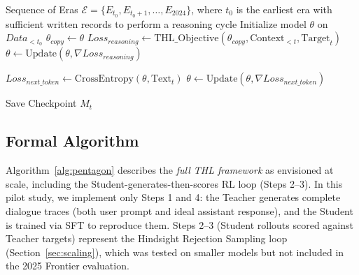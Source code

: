 \documentclass[11pt,a4paper]{article}
\begin{document}
\begin{algorithm}[ht]
\caption{The Council of Time (Iterative Era Learning)}
\label{alg:council}
\begin{algorithmic}[1]
\REQUIRE Sequence of Eras $\mathcal{E} = \{E_{t_0}, E_{t_0+1}, \dots, E_{2024}\}$, where $t_0$ is the earliest era with sufficient written records to perform a reasoning cycle
\STATE Initialize model $\theta$ on $Data_{<t_0}$
    \STATE {}
    \STATE $\theta_{copy} \leftarrow \theta$ 
        \STATE $Loss_{reasoning} \leftarrow \text{THL\_Objective}(\theta_{copy}, \text{Context}_{<t}, \text{Target}_{t})$
        \STATE $\theta \leftarrow \text{Update}(\theta, \nabla Loss_{reasoning})$
    \ENDFOR

    \STATE {}
        \STATE $Loss_{next\_token} \leftarrow \text{CrossEntropy}(\theta, \text{Text}_{t})$
        \STATE $\theta \leftarrow \text{Update}(\theta, \nabla Loss_{next\_token})$
    \ENDFOR

    \STATE Save Checkpoint $M_t$ 
\ENDFOR
\end{algorithmic}
\end{algorithm}

\subsection{Formal Algorithm}

Algorithm~\ref{alg:pentagon} describes the \textit{full THL framework} as envisioned at scale, including the Student-generates-then-scores RL loop (Steps 2--3). In this pilot study, we implement only Steps 1 and 4: the Teacher generates complete dialogue traces (both user prompt and ideal assistant response), and the Student is trained via SFT to reproduce them. Steps 2--3 (Student rollouts scored against Teacher targets) represent the Hindsight Rejection Sampling loop (Section~\ref{sec:scaling}), which was tested on smaller models but not included in the 2025 Frontier evaluation.
\end{document}
